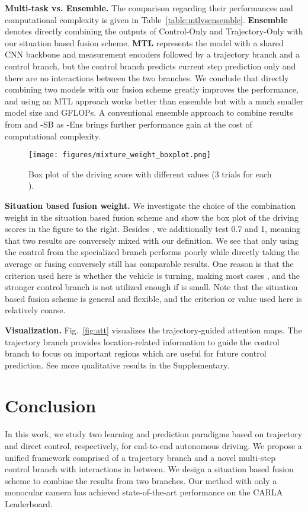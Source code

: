 \documentclass{article}
\begin{document}
\textbf{Multi-task vs. Ensemble.} 
The comparison regarding their performances and computational complexity is given in Table~\ref{table:mtlvsensemble}.
\textbf{Ensemble} denotes directly combining the outputs of Control-Only and Trajectory-Only with our situation based fusion scheme.
\textbf{MTL} represents the model with a shared CNN backbone and measurement encoders followed by a trajectory branch and a control branch, but the control branch predicts current step prediction only and there are no interactions between the two branches.
We conclude that directly combining two models with our fusion scheme greatly improves the performance, and using an MTL approach works better than ensemble but with a much smaller model size and GFLOPs. A conventional ensemble approach to combine results from \algname and \algname-SB as \algname-Ens brings further performance gain at the cost of computational complexity.


\captionsetup[wrapfigure]{font=footnotesize}
\begin{wrapfigure}{r}{0pt}
\texttt{[image: figures/mixture\_weight\_boxplot.png]}
\caption{Box plot of the driving score with different  values (3 trials for each ).}
    \label{fig:mixture_weight}
\end{wrapfigure}
\textbf{Situation based fusion weight.}
We investigate the choice of the combination weight  in the situation based fusion scheme and show the box plot of the driving scores in the figure to the right. Besides , we additionally test 0.7 and 1, meaning that two results are conversely mixed with our  definition.
We see that only using the control from the specialized branch  performs poorly while directly taking the average or fusing conversely still has comparable results. One reason is that the  criterion used here is whether the vehicle is turning, making most cases , and the stronger control branch is not utilized enough if  is small.
Note that the situation based fusion scheme is general and flexible, and the criterion or  value used here is relatively coarse. 



\textbf{Visualization.} Fig.~\ref{fig:att} visualizes the trajectory-guided attention maps. The trajectory branch provides location-related information to guide the control branch to focus on important regions which are useful for future control prediction. See more qualitative results in the Supplementary.


\section{Conclusion}
In this work, we study two learning and prediction paradigms based on trajectory and direct control, respectively, for end-to-end autonomous driving. We propose a unified framework comprised of a trajectory branch and a novel multi-step control branch with interactions in between. We design a situation based fusion scheme to combine the results from two branches. Our method with only a monocular camera has achieved state-of-the-art performance on the CARLA Leaderboard.
\end{document}

